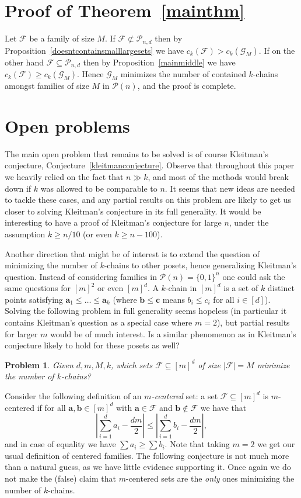 \documentclass[12pt]{article}
\newtheorem{proble}[theorem]{Problem}
\numberwithin{equation}{section}
\def\F{\mathcal{F}}
\def\G{\mathcal{G}}
\def\P{\mathcal{P}}
\begin{document}
\section{Proof of Theorem~\ref{mainthm}}
Let $\F$ be a family of size $M$. If $\F\not\subset\P_{n,d}$ then by Proposition~\ref{doesntcontainsmalllargesets} we have $c_k(\F) > c_k(\G_M)$. If on the other hand $\F\subseteq\P_{n,d}$ then by Proposition~\ref{mainmiddle} we have $c_k(\F)\geq c_k(\G_M)$. Hence $\G_M$ minimizes the number of contained $k$-chains amongst families of size $M$ in $\P(n)$, and the proof is complete.

\section{Open problems}

The main open problem that remains to be solved is of course Kleitman's conjecture, Conjecture~\ref{kleitmanconjecture}. Observe that throughout this paper we heavily relied on the fact that $n\gg k$, and most of the methods would break down if $k$ was allowed to be comparable to $n$. It seems that new ideas are needed to tackle these cases, and any partial results on this problem are likely to get us closer to solving Kleitman's conjecture in its full generality.
It would be interesting to have a proof of Kleitman's conjecture for large $n$, under the assumption  $k\geq n/10$ (or even $k \geq n-100$).


Another direction that might be of interest is to extend the question of minimizing the number of $k$-chains to other posets, hence generalizing Kleitman's question. Instead of considering families in $\P(n)=\{0,1\}^n$ one could ask the same questions for $[m]^2$ or even $[m]^d$. A $k$-chain in $[m]^d$ is a set of $k$ distinct points satisfying $\mathbf{a}_1\leq \ldots \leq \mathbf{a}_k$ (where $\mathbf{b}\leq \mathbf{c}$ means $b_i\leq c_i$ for all $i\in [d]$). Solving the following problem in full generality seems hopeless (in particular it contains Kleitman's question as a special case where $m=2$), but partial results for larger $m$ would be of much interest. Is a similar phenomenon as in Kleitman's conjecture likely to hold for these posets as well?

\begin{proble}\label{generalquestion}
Given $d,m,M,k$, which sets $\F\subseteq [m]^d$ of size $|\F|=M$ minimize the number of $k$-chains?
\end{proble}

Consider the following definition of an $m$\emph{-centered} set: a set $\F\subseteq [m]^d$ is $m$-centered if for all $\mathbf{a},\mathbf{b}\in [m]^d$ with $\mathbf{a}\in \F$ and $\mathbf{b}\notin \F$ we have that $$\left\lvert\sum_{i=1}^d a_i - \frac{dm}{2}\right\rvert \leq \left\lvert\sum_{i=1}^d b_i - \frac{dm}{2}\right\rvert,$$ and in case of equality we have $\sum a_i \geq \sum b_i$. Note that taking $m=2$ we get our usual definition of centered families. The following conjecture is not much more than a natural guess, as we have little evidence supporting it. Once again we do not make the (false) claim that $m$-centered sets are the \emph{only} ones minimizing the number of $k$-chains.  
\end{document}
